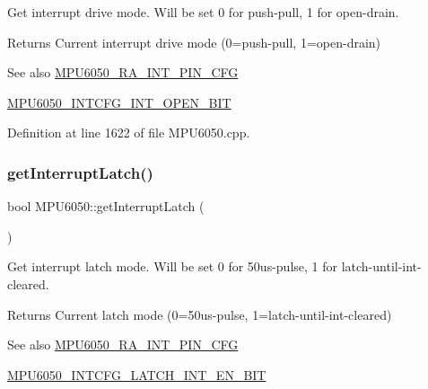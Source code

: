 Get interrupt drive mode. Will be set 0 for push-\/pull, 1 for open-\/drain. \begin{DoxyReturn}{Returns}
Current interrupt drive mode (0=push-\/pull, 1=open-\/drain) 
\end{DoxyReturn}
\begin{DoxySeeAlso}{See also}
\mbox{\hyperlink{MPU6050_8h_a82344e1daef2bac2e0d938319528be6c}{M\+P\+U6050\+\_\+\+R\+A\+\_\+\+I\+N\+T\+\_\+\+P\+I\+N\+\_\+\+C\+FG}} 

\mbox{\hyperlink{MPU6050_8h_ae8cef0becbc209ac15fea3d86261d324}{M\+P\+U6050\+\_\+\+I\+N\+T\+C\+F\+G\+\_\+\+I\+N\+T\+\_\+\+O\+P\+E\+N\+\_\+\+B\+IT}} 
\end{DoxySeeAlso}


Definition at line 1622 of file M\+P\+U6050.\+cpp.


\begin{DoxyCode}{0}

\end{DoxyCode}
\mbox{\label{classMPU6050_a5502c4c2a9bc4ea9267e128b7743923d}} 
\subsubsection{\texorpdfstring{getInterruptLatch()}{getInterruptLatch()}}
{\footnotesize\ttfamily bool M\+P\+U6050\+::get\+Interrupt\+Latch (\begin{DoxyParamCaption}{ }\end{DoxyParamCaption})}

Get interrupt latch mode. Will be set 0 for 50us-\/pulse, 1 for latch-\/until-\/int-\/cleared. \begin{DoxyReturn}{Returns}
Current latch mode (0=50us-\/pulse, 1=latch-\/until-\/int-\/cleared) 
\end{DoxyReturn}
\begin{DoxySeeAlso}{See also}
\mbox{\hyperlink{MPU6050_8h_a82344e1daef2bac2e0d938319528be6c}{M\+P\+U6050\+\_\+\+R\+A\+\_\+\+I\+N\+T\+\_\+\+P\+I\+N\+\_\+\+C\+FG}} 

\mbox{\hyperlink{MPU6050_8h_a5704a7815c0fa6dcbfd4666a70e89d90}{M\+P\+U6050\+\_\+\+I\+N\+T\+C\+F\+G\+\_\+\+L\+A\+T\+C\+H\+\_\+\+I\+N\+T\+\_\+\+E\+N\+\_\+\+B\+IT}} 
\end{DoxySeeAlso}


